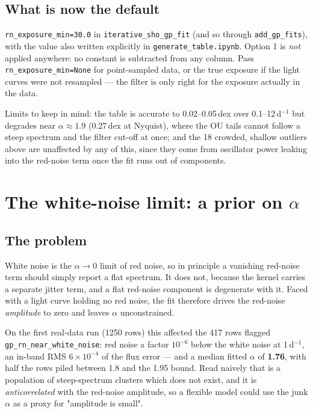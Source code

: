 \documentclass[11pt]{article}
\newcommand{\code}[1]{\texttt{#1}}
\begin{document}
\subsection{What is now the default}

\code{rn\_exposure\_min=30.0} in \code{iterative\_sho\_gp\_fit} (and so through
\code{add\_gp\_fits}), with the value also written explicitly in
\code{generate\_table.ipynb}. Option 1 is \emph{not} applied anywhere: no constant is
subtracted from any column. Pass \code{rn\_exposure\_min=None} for point-sampled data, or
the true exposure if the light curves were not resampled --- the filter is only right for
the exposure actually in the data.

Limits to keep in mind: the table is accurate to 0.02--0.05\,dex over 0.1--12\,d$^{-1}$ but
degrades near $\alpha \approx 1.9$ (0.27\,dex at Nyquist), where the OU tails cannot follow a
steep spectrum and the filter cut-off at once; and the 18 crowded, shallow outliers above
are unaffected by any of this, since they come from oscillator power leaking into the
red-noise term once the fit runs out of components.

\section{The white-noise limit: a prior on $\alpha$}

\subsection{The problem}

White noise is the $\alpha \to 0$ limit of red noise, so in principle a vanishing red-noise
term should simply report a flat spectrum. It does not, because the kernel carries a
separate jitter term, and a flat red-noise component is degenerate with it. Faced with a
light curve holding no red noise, the fit therefore drives the red-noise \emph{amplitude}
to zero and leaves $\alpha$ unconstrained.

On the first real-data run (1250 rows) this affected the 417 rows flagged
\code{gp\_rn\_near\_white\_noise}: red noise a factor $10^{-6}$ below the white noise at
1\,d$^{-1}$, an in-band RMS $6\times10^{-4}$ of the flux error --- and a median fitted
$\alpha$ of \textbf{1.76}, with half the rows piled between 1.8 and the 1.95 bound. Read
naively that is a population of steep-spectrum clusters which does not exist, and it is
\emph{anticorrelated} with the red-noise amplitude, so a flexible model could use the
junk $\alpha$ as a proxy for "amplitude is small".
\end{document}
